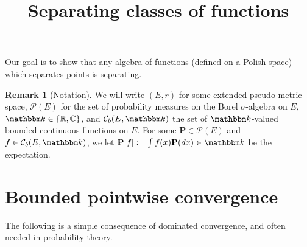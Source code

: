 \documentclass{article}
\theoremstyle{definition}
\newtheorem{remark}[proposition]{Remark}
\theoremstyle{step} \newtheorem{step}{Step}
\begin{document}
\title{\LARGE Separating classes of functions}

\maketitle Our goal is to show that any algebra of functions (defined
on a Polish space) which separates points is separating.

\begin{remark}[Notation]
  We will write $(E,r)$ for some extended pseudo-metric space, $\mathcal
    P(E)$ for the set of probability measures on the Borel
  $\sigma$-algebra on $E$, $\mathbbm k \in \{\mathbb R, \mathbb C\}$,
  and $\mathcal C_{b}(E, \mathbbm k)$ the set of $\mathbbm k$-valued
  bounded continuous functions on $E$. For some $\mathbf P \in \mathcal
    P(E)$ and $f \in \mathcal C_{b}(E, \mathbbm k)$, we let $\mathbf P[f]
    := \int f(x) \mathbf P(dx) \in \mathbbm k$ be the expectation.
\end{remark}

\section{Bounded pointwise convergence}

The following is a simple consequence of dominated convergence, and
often needed in probability theory.
\end{document}
